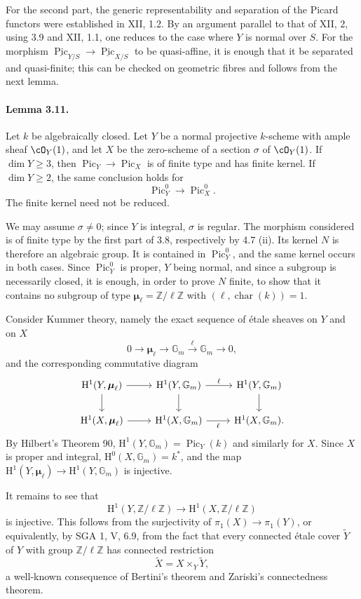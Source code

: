 \documentclass[11pt]{article}
\theoremstyle{plain}
\theoremstyle{definition}
\theoremstyle{remark}
\newcommand{\ZZ}{\mathbb Z}
\DeclareMathOperator{\Pic}{Pic}
\newcommand{\Gm}{\mathbb G_m}
\newcommand{\longto}{\longrightarrow}
\newcommand{\HH}{\mathrm H}
\providecommand{\bmu}{\boldsymbol{\mu}}
\providecommand{\car}{\operatorname{char}}
\begin{document}
For the second part, the generic representability and separation of the Picard functors were established in XII, 1.2. By an argument parallel to that of XII, 2, using 3.9 and XII, 1.1, one reduces to the case where $Y$ is normal over $S$. For the morphism $\underline{\Pic}_{Y/S}\to \underline{\Pic}_{X/S}$ to be quasi-affine, it is enough that it be separated and quasi-finite; this can be checked on geometric fibres and follows from the next lemma.

\paragraph{Lemma 3.11.}
Let $k$ be algebraically closed. Let $Y$ be a normal projective $k$-scheme with ample sheaf $\cO_Y(1)$, and let $X$ be the zero-scheme of a section $\sigma$ of $\cO_Y(1)$. If $\dim Y\geq 3$, then $\Pic_Y\to \Pic_X$ is of finite type and has finite kernel. If $\dim Y\geq 2$, the same conclusion holds for
\[
\Pic^0_Y\longto \Pic^0_X.
\]
The finite kernel need not be reduced.

We may assume $\sigma\neq 0$; since $Y$ is integral, $\sigma$ is regular. The morphism considered is of finite type by the first part of 3.8, respectively by 4.7 (ii). Its kernel $N$ is therefore an algebraic group. It is contained in $\Pic^0_Y$, and the same kernel occurs in both cases. Since $\Pic^0_Y$ is proper, $Y$ being normal, and since a subgroup is necessarily closed, it is enough, in order to prove $N$ finite, to show that it contains no subgroup of type $\bmu_\ell=\ZZ/\ell\ZZ$ with $(\ell,\car(k))=1$.

Consider Kummer theory, namely the exact sequence of étale sheaves on $Y$ and on $X$
\[
0\longto \bmu_\ell\longto \Gm \xrightarrow{\ell}\Gm\longto 0,
\]
and the corresponding commutative diagram
\[
\begin{tikzcd}
\HH^1(Y,\bmu_\ell)\arrow[r]\arrow[d] &
\HH^1(Y,\Gm)\arrow[r,"\ell"]\arrow[d] &
\HH^1(Y,\Gm)\arrow[d]\\
\HH^1(X,\bmu_\ell)\arrow[r] &
\HH^1(X,\Gm)\arrow[r,"\ell"'] &
\HH^1(X,\Gm).
\end{tikzcd}
\]
By Hilbert's Theorem 90, $\HH^1(Y,\Gm)=\Pic_Y(k)$ and similarly for $X$. Since $X$ is proper and integral, $\HH^0(X,\Gm)=k^*$, and the map $\HH^1(Y,\bmu_\ell)\to\HH^1(Y,\Gm)$ is injective.

It remains to see that
\[
\HH^1(Y,\ZZ/\ell\ZZ)\longto\HH^1(X,\ZZ/\ell\ZZ)
\]
is injective. This follows from the surjectivity of $\pi_1(X)\to\pi_1(Y)$, or equivalently, by SGA 1, V, 6.9, from the fact that every connected étale cover $\widetilde Y$ of $Y$ with group $\ZZ/\ell\ZZ$ has connected restriction
\[
\widetilde X=X\times_Y\widetilde Y,
\]
a well-known consequence of Bertini's theorem and Zariski's connectedness theorem.
\end{document}
